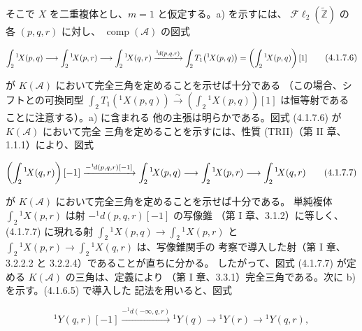 \clearpage
{}%
\begingroup\small\setlength{\parskip}{0pt}\setlength{\emergencystretch}{1.5em}
\setlength{\abovedisplayskip}{4pt plus 2pt minus 2pt}%
\setlength{\belowdisplayskip}{4pt plus 2pt minus 2pt}%

そこで $X$ を二重複体とし、$m=1$ と仮定する。a) を示すには、
$\mathcal{F}\ell_2(\widetilde{\mathbb Z})$ の各 $(p,q,r)$ に対し、
$\operatorname{comp}(\mathcal A)$ の図式

\begin{equation}
\resizebox{0.98\linewidth}{!}{$
\displaystyle
\int_2{}^{1}\!X(p,q)\longrightarrow
\int_2{}^{1}\!X(p,r)\longrightarrow
\int_2{}^{1}\!X(q,r)
\xrightarrow{{}^{1}\!d(p,q,r)}
\int_2T_1\bigl({}^{1}\!X(p,q)\bigr)
=\left(\int_2{}^{1}\!X(p,q)\right)[1]
$}
\tag{4.1.7.6}
\end{equation}

が $K(\mathcal A)$ において完全三角を定めることを示せば十分である
（この場合、シフトとの可換同型
$\int_2T_1({}^{1}\!X(p,q))\xrightarrow{\sim}
(\int_2{}^{1}\!X(p,q))[1]$ は恒等射であることに注意する）。a) に含まれる
他の主張は明らかである。図式 (4.1.7.6) が $K(\mathcal A)$ において完全
三角を定めることを示すには、性質 (TRII)（第 II 章、1.1.1）により、図式

\begin{equation}
\resizebox{0.96\linewidth}{!}{$
\displaystyle
\left(\int_2{}^{1}\!X(q,r)\right)[-1]
\xrightarrow{-{}^{1}\!d(p,q,r)[-1]}
\int_2{}^{1}\!X(p,q)\longrightarrow
\int_2{}^{1}\!X(p,r)\longrightarrow
\int_2{}^{1}\!X(q,r)
$}
\tag{4.1.7.7}
\end{equation}

が $K(\mathcal A)$ において完全三角を定めることを示せば十分である。
単純複体 $\int_2{}^{1}\!X(p,r)$ は射 $-{}^{1}\!d(p,q,r)[-1]$ の写像錐
（第 I 章、3.1.2）に等しく、(4.1.7.7) に現れる射
$\int_2{}^{1}\!X(p,q)\longrightarrow\int_2{}^{1}\!X(p,r)$ と
$\int_2{}^{1}\!X(p,r)\longrightarrow\int_2{}^{1}\!X(q,r)$ は、写像錐関手の
考察で導入した射（第 I 章、3.2.2.2 と 3.2.2.4）であることが直ちに分かる。
したがって、図式 (4.1.7.7) が定める $K(\mathcal A)$ の三角は、定義により
（第 I 章、3.3.1）完全三角である。次に b) を示す。(4.1.6.5) で導入した
記法を用いると、図式

\begin{equation}
{}^{1}\!Y(q,r)[-1]
\xrightarrow{-{}^{1}\!d(-\infty,q,r)}
{}^{1}\!Y(q)\longrightarrow{}^{1}\!Y(r)\longrightarrow{}^{1}\!Y(q,r),
\tag{4.1.7.8}
\end{equation}

